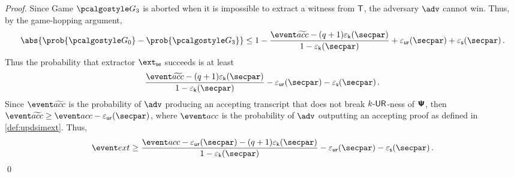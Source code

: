 \begin{proof}
	 Since Game $\game{3}$ is aborted when it is impossible to
	extract a witness from $\mathsf{T}$,
	the adversary $\advse$ cannot win. Thus, by the game-hopping argument,
	\[
	\abs{\prob{\game{0}} - \prob{\game{3}}} \leq 1 - \frac{\waccProb - (q
			+ 1) \epsk(\secpar)}{1 - \epsk(\secpar)} + \epsur(\secpar) +
	\epss(\secpar)\,.
	\]
	Thus the probability that extractor $\extse$ succeeds is at least
	\[
	\frac{\waccProb - (q + 1) \epsk(\secpar)}{1 - \epsk(\secpar)} -
	\epsur(\secpar)
	- \epss(\secpar)\,.
	\]
	Since $\waccProb$ is the probability of $\advse$ producing an accepting transcript
	that does not break ${k\text{-}\mathsf{UR}}$-ness of $\bm{\mathsf{\Psi}}$, then $\waccProb \geq \accProb -
	\epsur(\secpar)$, where $\accProb$ is the probability of $\advse$ outputting an accepting
	proof as defined in \cref{def:updsimext}. Thus, 
	\begin{equation}
	\label{eq:frk}
	\extProb \geq \frac{\accProb - \epsur(\secpar) - (q + 1) \epsk(\secpar)}{1 - \epsk(\secpar)} 
	- \epsur(\secpar) - \epss(\secpar)\,.
	\end{equation} 
	\qed
\end{proof}


